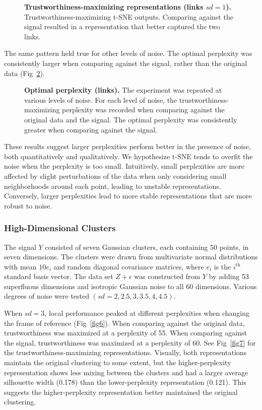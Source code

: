 \documentclass[10pt,letterpaper]{article}
\begin{document}
\begin{figure}[!h]
\caption{{\bf Trustworthiness-maximizing representations (links $sd = 1$).}
Trustworthiness-maximizing t-SNE outputs. Comparing against the signal resulted in a representation that better captured the two links.}
\label{fig4}
\end{figure}

The same pattern held true for other levels of noise. The optimal perplexity was consistently larger when comparing against the signal, rather than the original data (Fig~\ref{fig5}).

\begin{figure}[!h]
\caption{{\bf Optimal perplexity (links).}
The experiment was repeated at various levels of noise. For each level of noise, the trustworthiness-maximizing perplexity was recorded when comparing against the original data and the signal. The optimal perplexity was consistently greater when comparing against the signal.}
\label{fig5}
\end{figure}

These results suggest larger perplexities perform better in the presence of noise, both quantitatively and qualitatively. We hypothesize t-SNE tends to overfit the noise when the perplexity is too small. Intuitively, small perplexities are more affected by slight perturbations of the data when only considering small neighborhoods around each point, leading to unstable representations. Conversely, larger perplexities lead to more stable representations that are more robust to noise.

\subsubsection*{High-Dimensional Clusters}
The signal $Y$ consisted of seven Gaussian clusters, each containing 50 points, in seven dimensions. The clusters were drawn from multivariate normal distributions with mean $10e_i$ and random diagonal covariance matrices, where $e_i$ is the $i^\textrm{th}$ standard basis vector. The data set $Z + \epsilon$ was constructed from $Y$ by adding 53 superfluous dimensions and isotropic Gaussian noise to all 60 dimensions. Various degrees of noise were tested $(sd = 2, 2.5, 3, 3.5, 4, 4.5)$.

When $sd = 3$, local performance peaked at different perplexities when changing the frame of reference (Fig~\ref{fig6}). When comparing against the original data, trustworthiness was maximized at a perplexity of 55. When comparing against the signal, trustworthiness was maximized at a perplexity of 60. See Fig~\ref{fig7} for the trustworthiness-maximizing representations. Visually, both representations maintain the original clustering to some extent, but the higher-perplexity representation shows less mixing between the clusters and had a larger average silhouette width (0.178) than the lower-perplexity representation (0.121). This suggests the higher-perplexity representation better maintained the original clustering.
\end{document}
